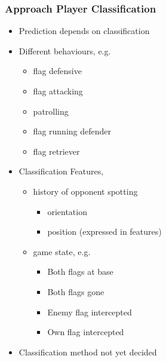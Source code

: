 \documentclass{beamer}
\begin{document}
        \begin{frame}
            \frametitle{Approach Player Classification}
            \begin{itemize}
                \item Prediction depends on classification
                \item Different behaviours, e.g.
                    \begin{itemize}
                        \item flag defensive
                        \item flag attacking
                        \item patrolling
                        \item flag running defender
                        \item flag retriever
                    \end{itemize}
                \item Classification Features,
                    \begin{itemize}
                        \item history of opponent spotting
                            \begin{itemize}
                                \item orientation
                                \item position (expressed in features)
                            \end{itemize}
                        \item game state, e.g.
                            \begin{itemize}
                                \item Both flags at base
                                \item Both flags gone
                                \item Enemy flag intercepted
                                \item Own flag intercepted
                            \end{itemize}
                    \end{itemize}
                \item Classification method not yet decided
            \end{itemize}
        \end{frame}
\end{document}
